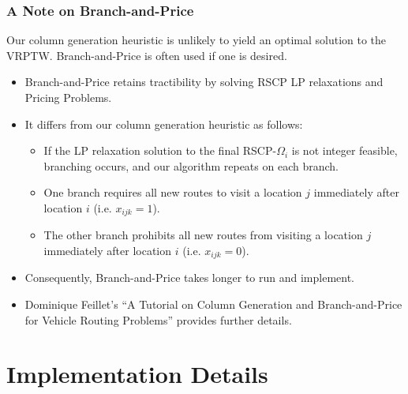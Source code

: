\documentclass{beamer}
\begin{document}
	\begin{frame}[t]
		\frametitle{A Note on Branch-and-Price}
		\small
		\vspace{-.25cm}
		\begin{block}{}
			Our column generation heuristic is unlikely to yield an optimal solution to the VRPTW. Branch-and-Price is often used if one is desired.
		\end{block}
		\vspace{-.25cm}
		\begin{itemize}
			\item Branch-and-Price retains tractibility by solving RSCP LP relaxations and Pricing Problems.
			\item It differs from our column generation heuristic as follows:
			\begin{itemize}
				\item If the LP relaxation solution to the final RSCP-$ \Omega_i $ is not integer feasible, branching occurs, and our algorithm repeats on each branch.
				\item One branch requires all new routes to visit a location $ j $ immediately after location $ i $ (i.e. $ x_{ijk} = 1 $).
				\item The other branch prohibits all new routes from visiting a location $ j $ immediately after location $ i $ (i.e. $ x_{ijk} = 0 $).
			\end{itemize}
			\item Consequently, Branch-and-Price takes longer to run and implement.
			\item Dominique Feillet's “A Tutorial on Column Generation and Branch-and-Price for Vehicle Routing Problems” provides further details.
		\end{itemize}
		\normalsize
	\end{frame}

	\section{Implementation Details}
	
\end{document}
